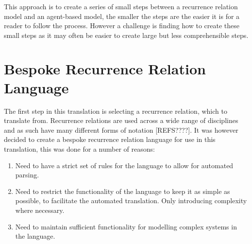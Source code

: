 \documentclass{article}
\begin{document}
This approach is to create a series of small steps between a recurrence relation model and an agent-based model, the smaller the steps are the easier it is for a reader to follow the process. However a challenge is finding how to create these small steps as it may often be easier to create large but less comprehensible steps.   









\section{Bespoke Recurrence Relation Language} \label{beskoperecurrancerealtion}













The first step in this translation is selecting a recurrence relation, which to translate from. Recurrence relations are used across a wide range of disciplines and as such have many different forms of notation {\color{red} [REFS????]}. It was however decided to create a bespoke recurrence relation language for use in this translation, this was done for a number of reasons:
\begin{enumerate}
  \item Need to have a strict set of rules for the language to allow for automated parsing. 
  \item Need to restrict the functionality of the language to keep it as simple as possible, to facilitate the automated translation. Only introducing complexity where necessary.  
  \item Need to maintain sufficient functionality for modelling complex systems in the language.  
\end{enumerate} 
\end{document}
